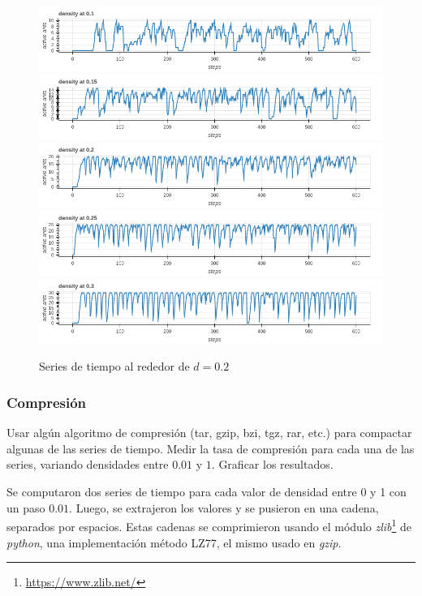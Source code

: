 \documentclass{article}
\newcommand{\furl}[1]{\footnote{\url{#1}}}
\begin{document}
\begin{figure}
  \centering
  \includegraphics[width=\textwidth]{imgs/chaos01.png}
  \includegraphics[width=\textwidth]{imgs/chaos015.png}
  \includegraphics[width=\textwidth]{imgs/chaos02.png}
  \includegraphics[width=\textwidth]{imgs/chaos025.png}
  \includegraphics[width=\textwidth]{imgs/chaos03.png}
  \caption{Series de tiempo al rededor de $d=0.2$}
  \label{fig:ant-chaos}
\end{figure}

\subsubsection{Compresión}

Usar algún algoritmo de compresión (tar, gzip, bzi, tgz, rar, etc.) para
compactar algunas de las series de tiempo. Medir la tasa de compresión para cada
una de las series, variando densidades entre $0.01$ y $1$. Graficar los
resultados.

Se computaron dos series de tiempo para cada valor de densidad entre 0 y 1 con
un paso $0.01$. Luego, se extrajeron los valores y se pusieron en una cadena,
separados por espacios. Estas cadenas se comprimieron usando el módulo
\textit{zlib}\furl{https://www.zlib.net/} de \textit{python}, una implementación
método LZ77, el mismo usado en \textit{gzip}.
\end{document}
